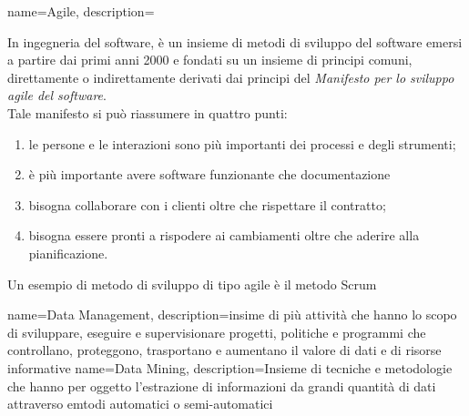 
\renewcommand{\acronymname}{Acronimi e abbreviazioni}

{
	name=Agile,
	description={
		 In ingegneria del software, è un insieme di metodi di sviluppo del software emersi a partire dai primi anni 2000 e fondati su un insieme di principi comuni, direttamente o indirettamente derivati dai principi del \textit{Manifesto per lo sviluppo agile del software}\cite{manifestoAgile}.\\
		 Tale manifesto si può riassumere in quattro punti:
		 \begin{enumerate}
		 	\item le persone e le interazioni sono più importanti dei processi e degli strumenti;
		 	\item è più importante avere software funzionante che documentazione
		 	\item bisogna collaborare con i clienti oltre che rispettare il contratto;
		 	\item bisogna essere pronti a rispodere ai cambiamenti oltre che aderire alla pianificazione.
		 \end{enumerate}
		 Un esempio di metodo di sviluppo di tipo agile è il metodo \gls{Scrum}}
}
{
	name=Data Management,
	description={insime di più attività che hanno lo scopo di sviluppare, eseguire e supervisionare progetti, politiche e programmi che controllano, proteggono, trasportano e aumentano il valore di dati e di risorse informative}
}
{
  name=Data Mining,
  description={Insieme di tecniche e metodologie che hanno per oggetto l'estrazione di informazioni da grandi quantità di dati attraverso
  emtodi automatici o semi-automatici}
}

